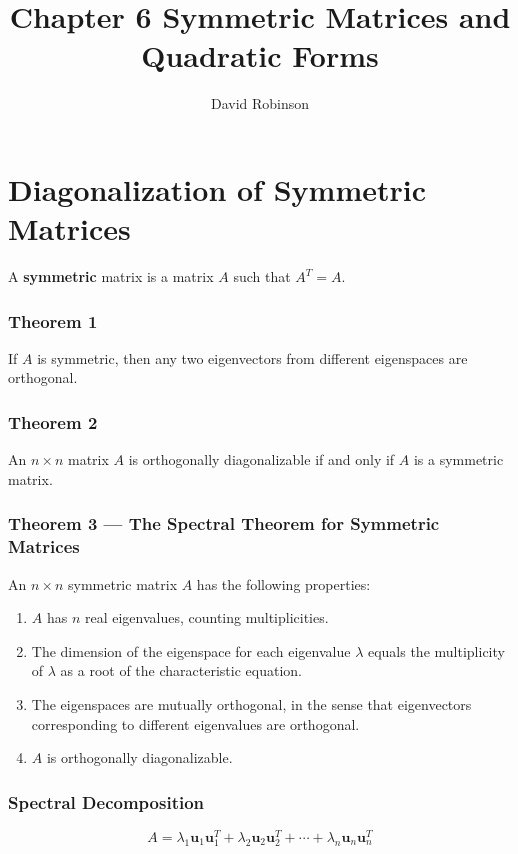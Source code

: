 \documentclass{article}
\title{Chapter 6 Symmetric Matrices and Quadratic Forms}
\author{David Robinson}
\date{}
\begin{document}
\maketitle

\section*{Diagonalization of Symmetric Matrices}

A \textbf{symmetric} matrix is a matrix $A$ such that $A^T = A$.

\subsubsection*{Theorem 1}
If $A$ is symmetric, then any two eigenvectors from different eigenspaces are orthogonal.

\subsubsection*{Theorem 2}
An $n\times n$ matrix $A$ is orthogonally diagonalizable if and only if $A$ is a symmetric matrix.

\subsubsection*{Theorem 3 --- The Spectral Theorem for Symmetric Matrices}
An $n\times n$ symmetric matrix $A$ has the following properties:
\begin{enumerate}
    \item $A$ has $n$ real eigenvalues, counting multiplicities.
    \item The dimension of the eigenspace for each eigenvalue $\lambda$ equals the multiplicity of
    $\lambda$ as a root of the characteristic equation.
    \item The eigenspaces are mutually orthogonal, in the sense that eigenvectors corresponding to
    different eigenvalues are orthogonal.
    \item $A$ is orthogonally diagonalizable.
\end{enumerate}

\subsubsection*{Spectral Decomposition}
\[A=\lambda_1\mathbf{u}_1\mathbf{u}_1^T+\lambda_2\mathbf{u}_2\mathbf{u}_2^T+\cdots +\lambda_n
\mathbf{u}_n\mathbf{u}_n^T\]
\end{document}
